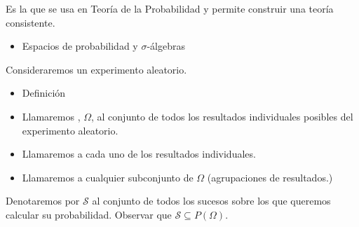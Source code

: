 Es la que se usa en Teoría de la Probabilidad y permite construir una teoría consistente.
\begin{itemize}[label=\color{red}\textbullet, leftmargin=*]
	\item \color{lightblue}Espacios de probabilidad y $\sigma$-álgebras
\end{itemize}
Consideraremos un experimento aleatorio.
\begin{itemize}[label=\color{red}\textbullet, leftmargin=*]
	\item \color{lightblue}Definición
\end{itemize}
\begin{itemize}[label=$-$]
	\item Llamaremos , $\Omega$, al conjunto de todos los resultados individuales posibles del experimento aleatorio.
	\item Llamaremos  a cada uno de los resultados individuales.
	\item Llamaremos  a cualquier subconjunto de $\Omega$ (agrupaciones de resultados.)
\end{itemize}
Denotaremos por $\mathcal{S}$ al conjunto de todos los sucesos sobre los que queremos calcular su probabilidad. Observar que $\mathcal{S}\subseteq P(\Omega)$.

